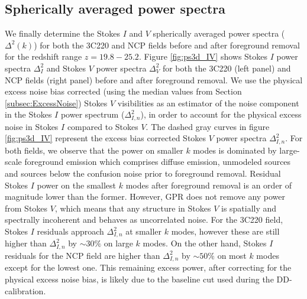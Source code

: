 \documentclass[fleqn,usenatbib]{mnras}
\begin{document}
\subsection{Spherically averaged power spectra}
We finally determine the Stokes $I$ and $V$ spherically averaged power spectra ($\Delta^2(k)$) for both the 3C220 and NCP fields before and after foreground removal for the redshift range $z = 19.8 - 25.2$. Figure \ref{fig:ps3d_IV} shows Stokes $I$ power spectra $\Delta_{I}^2$ and Stokes $V$ power spectra $\Delta_{V}^2$ for both the 3C220 (left panel) and NCP fields (right panel) before and after foreground removal. We use the physical excess noise bias corrected (using the median values from Section \ref{subsec:ExcessNoise}) Stokes $V$ visibilities as an estimator of the noise component in the Stokes $I$ power spectrum ($\Delta_{I,n}^2$), in order to account for the physical excess noise in Stokes $I$ compared to Stokes $V$. The dashed gray curves in figure \ref{fig:ps3d_IV} represent the excess bias corrected Stokes $V$ power spectra $\Delta_{I,n}^2$. For both fields, we observe that the power on smaller $k$ modes is dominated by large-scale foreground emission which comprises diffuse emission, unmodeled sources and sources below the confusion noise prior to foreground removal. Residual Stokes $I$ power on the smallest $k$ modes after foreground removal is an order of magnitude lower than the former. However, GPR does not remove any power from Stokes $V$, which means that any structure in Stokes $V$ is spatially and spectrally incoherent and behaves as uncorrelated noise. For the 3C220 field, Stokes $I$ residuals approach $\Delta_{I,n}^2$ at smaller $k$ modes, however these are still higher than $\Delta_{I,n}^2$ by $\sim 30\%$ on large $k$ modes. On the other hand, Stokes $I$ residuals for the NCP field are higher than $\Delta_{I,n}^2$ by $\sim50\%$ on most $k$ modes except for the lowest one. This remaining excess power, after correcting for the physical excess noise bias, is likely due to the baseline cut used during the DD-calibration.
\end{document}
